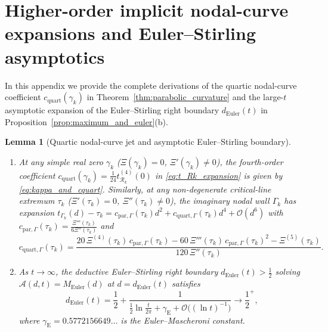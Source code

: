 \documentclass[11pt,a4paper,reqno]{amsart}
\newtheorem{lemma}[theorem]{Lemma}
\theoremstyle{definition}
\theoremstyle{remark}
\numberwithin{equation}{section}
\begin{document}
\appendix

\section{Higher-order implicit nodal-curve expansions and Euler--Stirling asymptotics}\label{app:expansions}

In this appendix we provide the complete derivations of the quartic nodal-curve coefficient $c_{\mathrm{quart}}(\gamma_k)$ in Theorem~\ref{thm:parabolic_curvature} and the large-$t$ asymptotic expansion of the Euler--Stirling right boundary $d_{\mathrm{Euler}}(t)$ in Proposition~\ref{prop:maximum_and_euler}(b).

\begin{lemma}[Quartic nodal-curve jet and asymptotic Euler--Stirling boundary]\label{lem:app_expansions}
\begin{enumerate}
\item[\textup{(a)}] At any simple real zero $\gamma_k$ ($\Xi(\gamma_k) = 0$, $\Xi'(\gamma_k) \neq 0$), the fourth-order coefficient $c_{\mathrm{quart}}(\gamma_k) = \frac{1}{24}t_{\mathcal{R}_k}^{(4)}(0)$ in \eqref{eq:t_Rk_expansion} is given by \eqref{eq:kappa_and_cquart}. Similarly, at any non-degenerate critical-line extremum $\tau_k$ ($\Xi'(\tau_k) = 0$, $\Xi''(\tau_k) \neq 0$), the imaginary nodal wall $\Gamma_k$ has expansion $t_{\Gamma_k}(d) - \tau_k = c_{\mathrm{par},\Gamma}(\tau_k)d^2 + c_{\mathrm{quart},\Gamma}(\tau_k)d^4 + \mathcal{O}(d^6)$ with $c_{\mathrm{par},\Gamma}(\tau_k) = \frac{\Xi'''(\tau_k)}{6\Xi''(\tau_k)}$ and
\begin{equation}\label{eq:cquart_wall}
c_{\mathrm{quart},\Gamma}(\tau_k) = \frac{20\,\Xi^{(4)}(\tau_k)\,c_{\mathrm{par},\Gamma}(\tau_k) - 60\,\Xi'''(\tau_k)\,c_{\mathrm{par},\Gamma}(\tau_k)^2 - \Xi^{(5)}(\tau_k)}{120\,\Xi''(\tau_k)}.
\end{equation}
\item[\textup{(b)}] As $t \to \infty$, the deductive Euler--Stirling right boundary $d_{\mathrm{Euler}}(t) > \frac{1}{2}$ solving $\mathcal{A}(d, t) = M_{\mathrm{Euler}}(d)$ at $d = d_{\mathrm{Euler}}(t)$ satisfies
\begin{equation}\label{eq:d_euler_asymp}
d_{\mathrm{Euler}}(t) = \frac{1}{2} + \frac{1}{\frac{1}{2}\ln\frac{t}{2\pi} + \gamma_{\mathrm{E}} + \mathcal{O}\big((\ln t)^{-1}\big)} \longrightarrow \frac{1}{2}^+,
\end{equation}
where $\gamma_{\mathrm{E}} = 0.5772156649\dots$ is the Euler--Mascheroni constant.
\end{enumerate}
\end{lemma}
\end{document}
